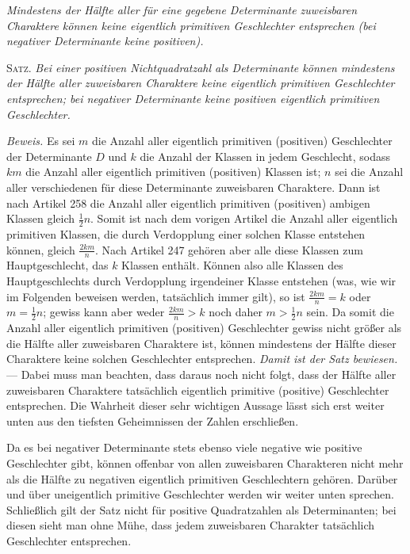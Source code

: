 \begin{center}
\textit{Mindestens der Hälfte aller für eine gegebene Determinante zuweisbaren Charaktere können keine eigentlich primitiven Geschlechter entsprechen (bei negativer Determinante keine positiven).}
\end{center}

\textsc{Satz.} \textit{Bei einer positiven Nichtquadratzahl als Determinante können mindestens der Hälfte aller zuweisbaren Charaktere keine eigentlich primitiven Geschlechter entsprechen; bei negativer Determinante keine positiven eigentlich primitiven Geschlechter.}

\textit{Beweis.} Es sei $m$ die Anzahl aller eigentlich primitiven (positiven) Geschlechter der Determinante $D$ und $k$ die Anzahl der Klassen in jedem Geschlecht, sodass $km$ die Anzahl aller eigentlich primitiven (positiven) Klassen ist; $n$ sei die Anzahl aller verschiedenen für diese Determinante zuweisbaren Charaktere. Dann ist
nach Artikel 258 die Anzahl aller eigentlich primitiven (positiven) ambigen Klassen gleich $\frac12 n$. Somit ist nach dem vorigen Artikel die Anzahl aller eigentlich primitiven Klassen, die durch Verdopplung einer solchen Klasse entstehen können, gleich $\frac{2km}{n}$. Nach Artikel 247 gehören aber alle diese Klassen zum Hauptgeschlecht, das $k$ Klassen enthält. Können also alle Klassen des Hauptgeschlechts durch Verdopplung irgendeiner Klasse entstehen (was, wie wir im Folgenden beweisen werden, tatsächlich immer gilt), so ist $\frac{2km}{n}=k$ oder $m=\frac12 n$; gewiss kann aber weder $\frac{2km}{n}>k$ noch daher $m>\frac12 n$ sein. Da somit die Anzahl aller eigentlich primitiven (positiven) Geschlechter gewiss nicht größer als die Hälfte aller zuweisbaren Charaktere ist, können mindestens der Hälfte dieser Charaktere keine solchen Geschlechter entsprechen. \textit{Damit ist der Satz bewiesen.} --- Dabei muss man beachten, dass daraus noch nicht folgt, dass der Hälfte aller zuweisbaren Charaktere tatsächlich eigentlich primitive (positive) Geschlechter entsprechen. Die Wahrheit dieser sehr wichtigen Aussage lässt sich erst weiter unten aus den tiefsten Geheimnissen der Zahlen erschließen.

Da es bei negativer Determinante stets ebenso viele negative wie positive Geschlechter gibt, können offenbar von allen zuweisbaren Charakteren nicht mehr als die Hälfte zu negativen eigentlich primitiven Geschlechtern gehören. Darüber und über uneigentlich primitive Geschlechter werden wir weiter unten sprechen. Schließlich gilt der Satz nicht für positive Quadratzahlen als Determinanten; bei diesen sieht man ohne Mühe, dass jedem zuweisbaren Charakter tatsächlich Geschlechter entsprechen.

